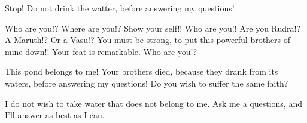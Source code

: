 Stop!
Do not drink the watter, before answering my questions!

Who are you!?
Where are you!?
Show your self!!
Who are you!!
Are you Rudra!?
A Maruth!?
Or a Vasu!?
You must be strong, to put this powerful brothers of mine down!!
Your feat is remarkable.
Who are you!?

This pond belongs to me!
Your brothers died, because they drank from its waters, before answering my questions!
Do you wish to suffer the same faith?

I do not wish to take water that does not belong to me.
Ask me a questions, and I'll answer as best as I can.